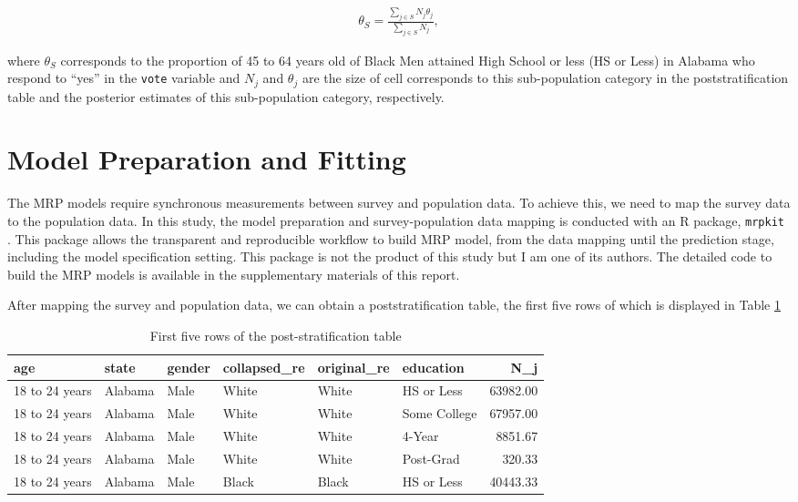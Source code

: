 \documentclass{monashthesis}
\begin{document}
\begin{equation} 
\begin{split}
\theta_S = \frac{\sum_{j\in S}N_j\theta_j}{\sum_{j\in S}N_j},
\end{split}
\label{eq:poststrat-observed}
\end{equation}

where \(\theta_S\) corresponds to the proportion of 45 to 64 years old of Black Men attained High School or less (HS or Less) in Alabama who respond to ``yes'' in the \texttt{vote} variable and \(N_j\) and \(\theta_j\) are the size of cell corresponds to this sub-population category in the poststratification table and the posterior estimates of this sub-population category, respectively.

\hypertarget{prep}{%
\section{Model Preparation and Fitting}\label{prep}}

The MRP models require synchronous measurements between survey and population data. To achieve this, we need to map the survey data to the population data. In this study, the model preparation and survey-population data mapping is conducted with an R package, \texttt{mrpkit} \autocite{mrpkit}. This package allows the transparent and reproducible workflow to build MRP model, from the data mapping until the prediction stage, including the model specification setting. This package is not the product of this study but I am one of its authors. The detailed code to build the MRP models is available in the supplementary materials of this report.

After mapping the survey and population data, we can obtain a poststratification table, the first five rows of which is displayed in Table \ref{tab:post-strat-table}

\begin{table}

\caption{\label{tab:post-strat-table}First five rows of the post-stratification table}
\centering
\begin{tabular}[t]{llllllr}
\toprule
age & state & gender & collapsed\_re & original\_re & education & N\_j\\
\midrule
18 to 24 years & Alabama & Male & White & White & HS or Less & 63982.00\\
18 to 24 years & Alabama & Male & White & White & Some College & 67957.00\\
18 to 24 years & Alabama & Male & White & White & 4-Year & 8851.67\\
18 to 24 years & Alabama & Male & White & White & Post-Grad & 320.33\\
18 to 24 years & Alabama & Male & Black & Black & HS or Less & 40443.33\\
\bottomrule
\end{tabular}
\end{table}
\end{document}
